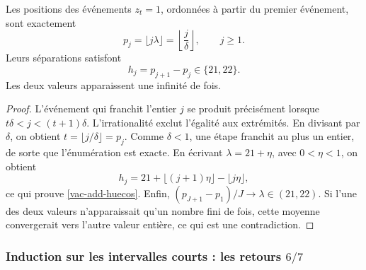 \begin{theorem}
\label{vac-add-teorema-primario}
Les positions des événements \(z_t=1\), ordonnées à partir du premier événement, sont exactement
\begin{equation}
 p_j=\lfloor j\lambda\rfloor
     =\left\lfloor\frac j\delta\right\rfloor,
 \qquad j\geq1.
 \label{vac-add-posiciones}
\end{equation}
Leurs séparations satisfont
\begin{equation}
 h_j=p_{j+1}-p_j\in\{21,22\}.
 \label{vac-add-huecos}
\end{equation}
Les deux valeurs apparaissent une infinité de fois.
\end{theorem}
\begin{proof}
L'événement qui franchit l'entier \(j\) se produit précisément lorsque
\(t\delta<j<(t+1)\delta\). L'irrationalité exclut l'égalité aux
extrémités. En divisant par \(\delta\), on obtient
\(t=\lfloor j/\delta\rfloor=p_j\). Comme \(\delta<1\), une étape
franchit au plus un entier, de sorte que l'énumération est exacte.
En écrivant \(\lambda=21+\eta\), avec \(0<\eta<1\), on obtient
\[
 h_j=21+\lfloor(j+1)\eta\rfloor-\lfloor j\eta\rfloor,
\]
ce qui prouve \eqref{vac-add-huecos}. Enfin, \((p_{J+1}-p_1)/J\to\lambda\in(21,22)\). Si l'une des deux valeurs n'apparaissait qu'un nombre fini de fois, cette moyenne convergerait vers l'autre valeur entière, ce qui est une contradiction.
\end{proof}

\subsubsection{Induction sur les intervalles courts : les retours \(6/7\)}
\label{vac-add-secundarios}

